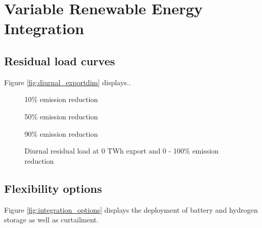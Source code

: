 
\section{Variable Renewable Energy Integration}

\subsection{Residual load curves}
\label{subsec:rlc}

Figure \ref{fig:diurnal_exportdim} displays..

\begin{figure*}[h] %
    \centering
    \begin{subfigure}[b]{0.3\linewidth}
        \centering
        \caption{10\% emission reduction}
        \label{fig:diurnal_10emred}
    \end{subfigure}
    \hfill
    \begin{subfigure}[b]{0.3\linewidth}
        \centering
        \caption{50\% emission reduction}
        \label{fig:diurnal_50emred}
    \end{subfigure}
    \hfill
    \begin{subfigure}[b]{0.3\linewidth}
        \centering
        \caption{90\% emission reduction}
        \label{fig:diurnal_90emred}
    \end{subfigure}
    \hfill
    \caption{Export dependent (0 - 200 TWh) residual load curves with various integration options. Each row represents different integration strategies (RLC without integration, RLC with curtailment, RLC with curtailment and electrolyser load).
    Each column represents different climate ambitions (10 - 90\% emission reduction)}
    \label{fig:diurnal_exportdim}
\end{figure*}


\begin{figure}[h!]
    \centering
    \caption{Diurnal residual load at 0 TWh export and 0 - 100\% emission reduction}
    \label{fig:diurnal}
\end{figure}

\subsection{Flexibility options}
\label{flex-options}
Figure \ref{fig:integration_options} displays the deployment of battery and hydrogen storage as well as curtailment.

